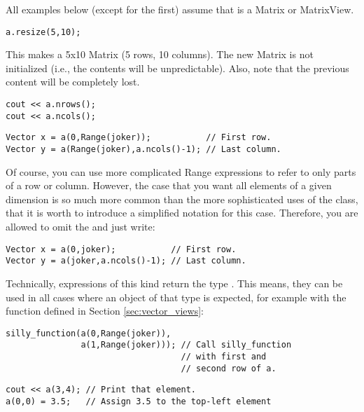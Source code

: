 
All examples below (except for the first) assume that  is a
Matrix or MatrixView.

\begin{verbatim}
a.resize(5,10);
\end{verbatim}
This makes  a 5x10 Matrix (5 rows, 10 columns). The new Matrix
is not initialized (i.e., the contents will be unpredictable). Also,
note that the previous content will be completely lost.

\begin{verbatim}
cout << a.nrows();
cout << a.ncols();
\end{verbatim}

\begin{verbatim}
Vector x = a(0,Range(joker));           // First row.
Vector y = a(Range(joker),a.ncols()-1); // Last column.
\end{verbatim}
Of course, you can use more complicated Range expressions to refer to
only parts of a row or column. However, the case that you want all
elements of a given dimension is so
much more common than the more sophisticated uses of the
 class, that it is worth to introduce a simplified
notation for this case. Therefore, you are allowed to
omit the  and just write:
\begin{verbatim}
Vector x = a(0,joker);           // First row.
Vector y = a(joker,a.ncols()-1); // Last column.
\end{verbatim}

Technically, expressions of this kind return the type
. This means, they can be used in all cases
where an object of that type is expected, for example with the
function defined in Section \ref{sec:vector_views}:

\begin{verbatim}
silly_function(a(0,Range(joker)),
               a(1,Range(joker))); // Call silly_function 
                                   // with first and 
                                   // second row of a.
\end{verbatim}



\begin{verbatim}
cout << a(3,4); // Print that element.
a(0,0) = 3.5;   // Assign 3.5 to the top-left element
\end{verbatim}

